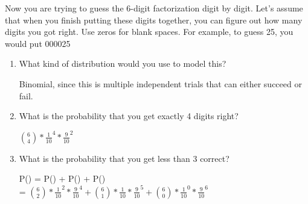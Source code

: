 \question Now you are trying to guess the 6-digit factorization digit 
by digit. Let’s assume that when you finish putting these digits together, 
you can figure out how many digits you got right. Use zeros for blank 
spaces. For example, to guess 25, you would put 000025

\begin{enumerate}[label=(\alph*)]
\item What kind of distribution would you use to model this?
\begin{solution}[1cm]
Binomial, since this is multiple independent trials that can either 
succeed or fail.
\end{solution}

\item What is the probability that you get exactly 4 digits right?
\begin{solution}[2cm]
${6 \choose 4} * \frac{1}{10}^4 * \frac{9}{10}^2$
\end{solution}		

\item What is the probability that you get less than 3 correct?
\begin{solution}[1cm]
P() = P() + P() + P() \\ = ${6 \choose 2} * \frac{1}{10}^2 * \frac{9}{10}^4 + {6 \choose 1} * 
\frac{1}{10} * \frac{9}{10}^5 + {6 \choose 0} * \frac{1}{10}^0*\frac{9}{10}^6$
\end{solution}
\end{enumerate}
